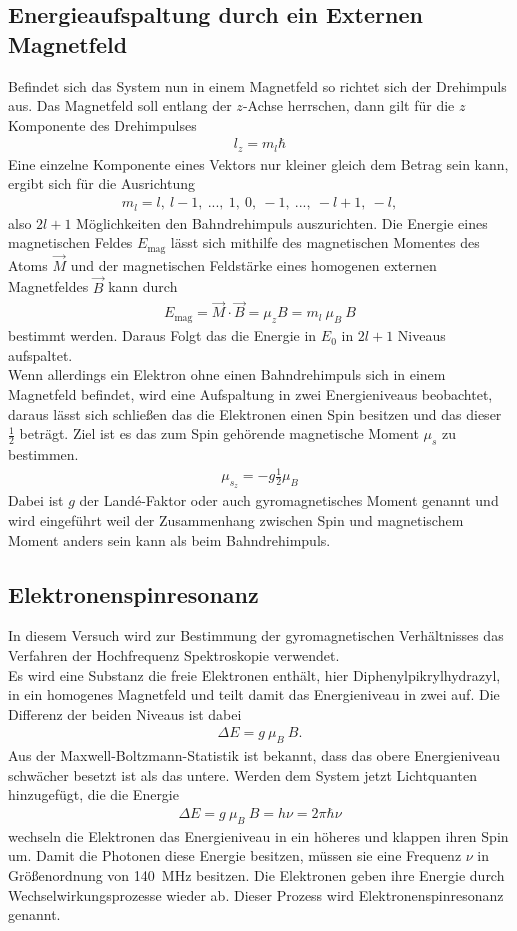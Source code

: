 \subsection{Energieaufspaltung durch ein Externen Magnetfeld}
Befindet sich das System nun in einem Magnetfeld so richtet sich der Drehimpuls aus. Das Magnetfeld soll entlang der $z$-Achse herrschen, dann gilt für die $z$ Komponente des Drehimpulses
\begin{align}
	l_z=m_l\hbar
\end{align}
Eine einzelne Komponente eines Vektors nur kleiner gleich dem Betrag sein kann, ergibt sich für die Ausrichtung
\begin{align}
	m_l = l,\ l-1,\ ...,\ 1,\ 0,\ -1,\ ... ,\ -l+1,\ -l,
\end{align}
also $2l+1 $ Möglichkeiten den Bahndrehimpuls auszurichten. Die Energie eines magnetischen Feldes $E_\text{mag}$ lässt sich mithilfe des magnetischen Momentes des Atoms $\vec{M}$ und der magnetischen Feldstärke eines homogenen externen Magnetfeldes $\vec{B}$ kann durch 
\begin{align}
	E_\text{mag}=\vec{M}\cdot\vec{B}=\mu_zB=m_l\ \mu_B\ B
\end{align}
bestimmt werden. Daraus Folgt das die Energie in $E_0$ in $2l+1$ Niveaus aufspaltet.\\
Wenn allerdings ein Elektron ohne einen Bahndrehimpuls sich in einem Magnetfeld befindet, wird eine Aufspaltung in zwei Energieniveaus beobachtet, daraus lässt sich schließen das die Elektronen einen Spin besitzen und das dieser $\frac{1}{2}$ beträgt. Ziel ist es das zum Spin gehörende magnetische Moment $\mu_s$ zu bestimmen.
\begin{align}
	\mu_{s_z}=-g\frac{1}{2}\mu_B
\end{align}
Dabei ist $g$ der Landé-Faktor oder auch gyromagnetisches  Moment genannt und wird eingeführt weil der Zusammenhang zwischen Spin und magnetischem Moment anders sein kann als beim Bahndrehimpuls.
\subsection{Elektronenspinresonanz}
In diesem Versuch wird zur Bestimmung der gyromagnetischen Verhältnisses das Verfahren der Hochfrequenz Spektroskopie verwendet.\\
Es wird eine Substanz die freie Elektronen enthält, hier Diphenylpikrylhydrazyl, in ein homogenes Magnetfeld und teilt damit das Energieniveau in zwei auf. Die Differenz der beiden Niveaus ist dabei 
\begin{align}
	\Delta E = g\ \mu_B \ B.
\end{align}
Aus der Maxwell-Boltzmann-Statistik ist bekannt, dass das obere Energieniveau schwächer besetzt ist als das untere. Werden dem System jetzt Lichtquanten hinzugefügt, die die Energie 
\begin{align}
	\Delta E = g\ \mu_B \ B = h\nu=2\pi\hbar\nu
\end{align}
wechseln die Elektronen das Energieniveau in ein höheres und klappen ihren Spin um. Damit die Photonen diese Energie besitzen, müssen sie eine Frequenz $\nu$ in Größenordnung von \SI{140}{\mega\hertz} besitzen. Die Elektronen geben ihre Energie durch Wechselwirkungsprozesse wieder ab. Dieser Prozess wird Elektronenspinresonanz genannt.